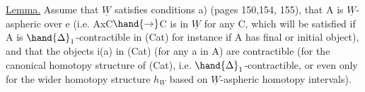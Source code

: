 \uline{Lemma.} Assume that $\underline{W}$ satisfies  conditions a)  (pages 150,154,
155), that A is $\underline{W}$-aspheric over e (i.e. AxC$\hand{\to}$C is in $\underline{W}$ for any C, 
which will be satisfied if A is $\hand{\Delta}_1$-contractible in (Cat)\hand{,} for instance
if A has  final or initial  object), and that the objects i(a)
in (Cat) (for any a in A) are contractible (for the canonical homotopy
structure of (Cat), i.e. $\hand{\Delta}_1$-contractible, or even only for the 
wider homotopy structure $h_{\underline{W}}$ based on $\underline{W}$-aspheric homotopy intervals).

